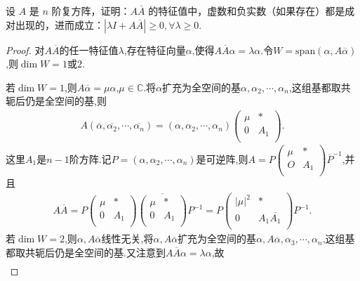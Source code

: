 \documentclass[../../main.tex]{subfiles}
\begin{document}
\begin{example}
设 $A$ 是 $n$ 阶复方阵，证明：$A\overline{A}$ 的特征值中，虚数和负实数（如果存在）都是成对出现的，进而成立：$|\lambda I + A\overline{A}| \geqslant  0, \forall \lambda \geqslant  0$.
\end{example}
\begin{proof}
对$A\overline{A}$的任一特征值$\lambda$,存在特征向量$\alpha$,使得$A\overline{A}\alpha =\lambda \alpha$.令$W=\mathrm{span}\left( \alpha ,A\overline{\alpha } \right)$,则$\dim W=1$或$2$.

若$\dim W=1$,则$A\overline{\alpha }=\mu \alpha$,$\mu \in \mathbb{C}$.将$\alpha$扩充为全空间的基$\alpha ,\alpha _2,\cdots ,\alpha _n$,这组基都取共轭后仍是全空间的基,则
\begin{align*}
A\left( \overline{\alpha },\overline{\alpha _2},\cdots ,\overline{\alpha _n} \right) =\left( \alpha ,\alpha _2,\cdots ,\alpha _n \right) \begin{pmatrix}
\mu&		*\\
0&		A_1\\
\end{pmatrix}.
\end{align*}
这里$A_1$是$n-1$阶方阵.记$P=\left( \alpha ,\alpha _2,\cdots ,\alpha _n \right)$是可逆阵,则$A=P\begin{pmatrix}
\mu&		*\\
O&		A_1\\
\end{pmatrix} \overline{P}^{-1}$,并且
\begin{align*}
A\overline{A}=P\begin{pmatrix}
\mu&		*\\
0&		A_1\\
\end{pmatrix} \overline{\begin{pmatrix}
\mu&		*\\
0&		A_1\\
\end{pmatrix} }P^{-1}=P\begin{pmatrix}
\left| \mu \right|^2&		*\\
0&		A_1\overline{A_1}\\
\end{pmatrix} P^{-1}.
\end{align*}
若$\dim W=2$,则$\alpha ,A\overline{\alpha }$线性无关,将$\alpha ,A\overline{\alpha }$扩充为全空间的基$\alpha ,A\overline{\alpha },\alpha _3,\cdots ,\alpha _n$,这组基都取共轭后仍是全空间的基.又注意到$A\overline{A}\alpha =\lambda \alpha$,故
\begin{align*}

\end{align*}
\end{proof}
\end{document}
